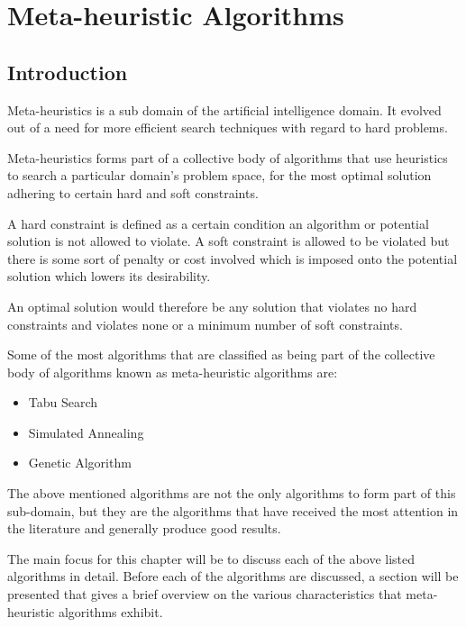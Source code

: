 \chapter{Meta-heuristic Algorithms}
\label{ch:metaheuristic}
\section{Introduction}
Meta-heuristics is a sub domain of the artificial intelligence domain. It evolved out of a need for more efficient search techniques with regard to hard problems. 

Meta-heuristics forms part of a collective body of algorithms that use heuristics to search a particular domain's problem space, for the most optimal solution adhering to certain hard and soft constraints\cite{AIModernApproach,NatureInspiredMetaHeuristic}. 

A hard constraint is defined as a certain condition an algorithm or potential solution is not allowed to violate\cite{AIModernApproach,NatureInspiredMetaHeuristic,Karen2004,Eisenblatter}. A soft constraint is allowed to be violated but there is some sort of penalty or cost involved which is imposed onto the potential solution which lowers its desirability\cite{AIModernApproach,NatureInspiredMetaHeuristic,Karen2004,Eisenblatter}. 

An optimal solution would therefore be any solution that violates no hard constraints and violates none or a minimum number of soft constraints\cite{AIModernApproach,NatureInspiredMetaHeuristic,Karen2004,Eisenblatter}.

Some of the most algorithms that are classified as being part of the collective body of algorithms known as meta-heuristic algorithms are:
\begin{itemize}
\item Tabu Search
\item Simulated Annealing
\item Genetic Algorithm
\end{itemize}
The above mentioned algorithms are not the only algorithms to form part of this sub-domain, but they are the algorithms that have received the most attention in the literature and generally produce good results\cite{SweepMeta}.

The main focus for this chapter will be to discuss each of the above listed algorithms in detail. Before each of the algorithms are discussed, a section will be presented that gives a brief overview on the various characteristics that meta-heuristic algorithms exhibit. 

